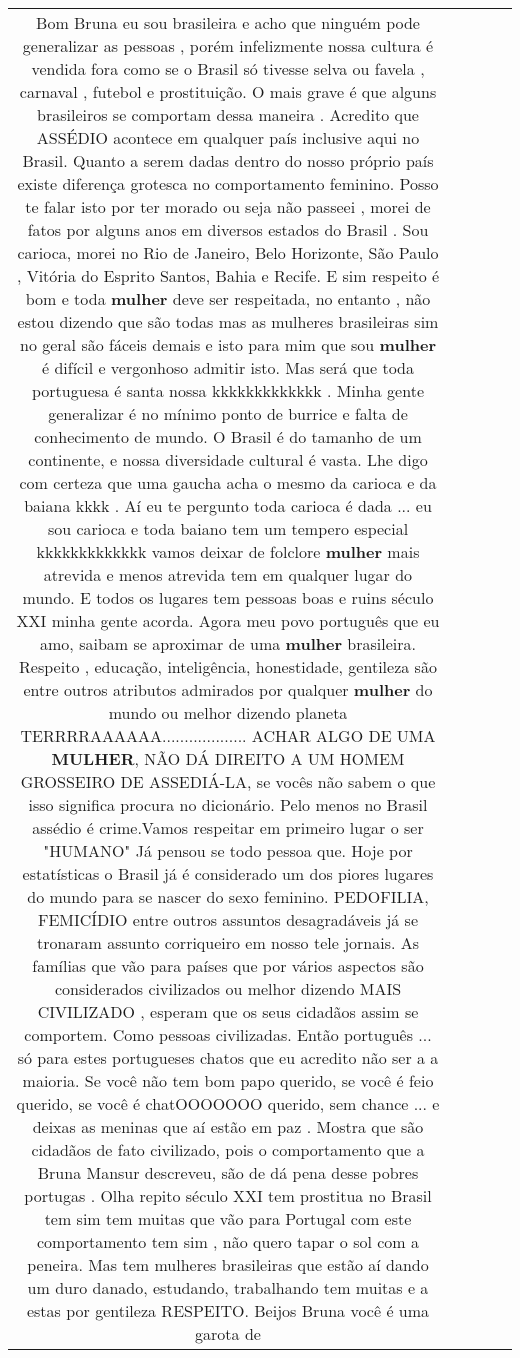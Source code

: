 \documentclass[11pt]{article}
\newlength\mylength
\begin{document}
\begin{center}
\begin{longtable}{|C{.65\mylength}|C{.30\mylength}|C{.12\mylength}|C{.12\mylength}|C{.12\mylength}|}
  \small Bom Bruna eu sou brasileira e acho que ninguém pode generalizar as pessoas , porém infelizmente nossa cultura é vendida fora como se o Brasil só tivesse selva ou favela , carnaval , futebol e prostituição. O mais grave é que alguns brasileiros se comportam dessa maneira . Acredito que ASSÉDIO acontece em qualquer país inclusive aqui no Brasil. Quanto a serem dadas dentro do nosso próprio país existe diferença grotesca no comportamento feminino. Posso te falar isto por ter morado ou seja não passeei , morei de fatos por alguns anos em diversos estados do Brasil . Sou carioca, morei no Rio de Janeiro, Belo Horizonte, São Paulo , Vitória do Esprito Santos, Bahia e Recife. E sim respeito é bom e toda \textbf{mulher} deve ser respeitada, no entanto , não estou dizendo que são todas mas as mulheres brasileiras sim no geral são fáceis demais e isto para mim que sou \textbf{mulher} é difícil e vergonhoso admitir isto.  Mas será que toda portuguesa é santa nossa kkkkkkkkkkkkk . Minha gente generalizar é no mínimo ponto de burrice e falta de conhecimento de mundo. O Brasil é do tamanho de um continente, e nossa diversidade cultural é vasta. Lhe digo com certeza que uma gaucha acha o mesmo da carioca e da baiana kkkk . Aí eu te pergunto toda carioca é dada ... eu sou carioca e toda baiano tem um tempero especial kkkkkkkkkkkkk vamos deixar de folclore \textbf{mulher} mais atrevida  e menos atrevida tem em qualquer lugar do mundo. E todos os lugares tem pessoas boas e ruins século XXI minha gente acorda. Agora meu povo português que eu amo, saibam se aproximar de uma \textbf{mulher} brasileira. Respeito , educação, inteligência, honestidade, gentileza são entre outros atributos admirados por qualquer \textbf{mulher}  do mundo ou melhor dizendo planeta TERRRRAAAAAA................... ACHAR ALGO DE UMA \textbf{MULHER},  NÃO  DÁ DIREITO A UM  HOMEM  GROSSEIRO DE ASSEDIÁ-LA, se vocês não sabem o que isso significa procura no dicionário. Pelo menos no Brasil assédio é crime.Vamos respeitar em primeiro lugar o ser "HUMANO" Já pensou se todo pessoa que. Hoje por estatísticas o Brasil já é considerado um dos piores lugares do mundo para se nascer  do sexo feminino. PEDOFILIA, FEMICÍDIO entre outros assuntos desagradáveis já se tronaram assunto corriqueiro em nosso tele jornais. As famílias que vão para países que por vários aspectos são considerados civilizados ou melhor dizendo MAIS CIVILIZADO , esperam que os seus cidadãos assim se comportem. Como pessoas civilizadas. Então português ... só para estes portugueses chatos que eu acredito não ser a a maioria. Se você não tem bom papo querido, se você é feio querido, se você é chatOOOOOOO querido, sem chance ... e deixas as meninas que aí estão em paz . Mostra que são cidadãos de fato civilizado, pois o comportamento que a Bruna Mansur descreveu, são de dá pena desse pobres portugas . Olha repito século XXI tem prostitua no Brasil tem sim tem muitas que vão para Portugal com este comportamento tem sim , não quero tapar  o sol com a peneira.  Mas tem mulheres brasileiras que estão aí dando um duro danado, estudando, trabalhando tem muitas e a estas por gentileza RESPEITO. Beijos Bruna você é uma garota de 
\end{longtable}
\end{center}
\end{document}
